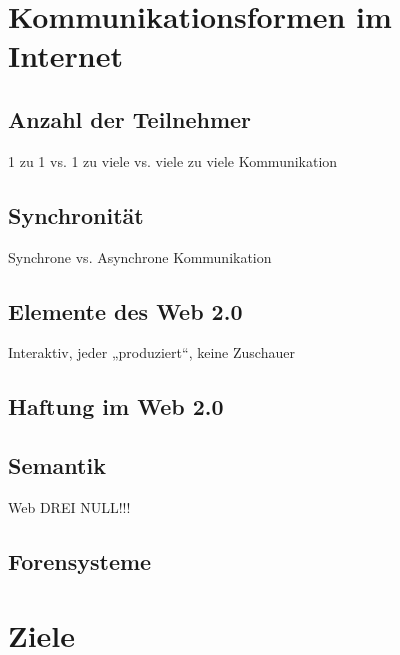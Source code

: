 \label{sec:grundlagen}

\section{Kommunikationsformen im Internet} %
\label{sec:kommunikationsformen_im_internet}

\subsection{Anzahl der Teilnehmer} %
\label{sub:anzahl_der_teilnehmer}
1 zu 1 vs. 1 zu viele vs. viele zu viele Kommunikation

\subsection{Synchronität} %
\label{sub:synchronitat}
Synchrone vs. Asynchrone Kommunikation

\subsection{Elemente des Web 2.0} %
\label{sub:elemente_des_web_2_0}
Interaktiv, jeder „produziert“, keine Zuschauer

\subsection{Haftung im Web 2.0} %
\label{sub:haftung_im_web_2_0}


\subsection{Semantik} %
\label{sub:semantik}
Web DREI NULL!!!

\subsection{Forensysteme} %
\label{sub:forensysteme}



\section{Ziele} %
\label{sec:ziele}

